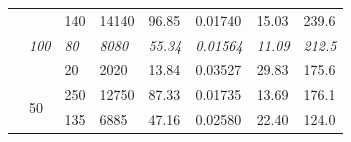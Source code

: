 \documentclass[a4paper, 11pt]{report}
\begin{document}
\begin{table}[ht]
\begin{tabular}{|l|l|l|l|l|l|l|l|}
        \cline{2-8}
                                                                                & \multirow{3}{*}{\textit{100 }}                                                  & 140                                                                    & 14140                                                                      & 96.85                                                                                            & 0.01740          & 15.03          & 239.6                                                                       \\ 
        \cline{3-8}
                                                                                &                                                                                 & \textit{80}                                                            & \textit{8080}                                                              & \textit{55.34}                                                                                   & \textit{0.01564} & \textit{11.09} & \textit{212.5}                                                              \\ 
        \cline{3-8}
                                                                                &                                                                                 & 20                                                                     & 2020                                                                       & 13.84                                                                                            & 0.03527          & 29.83          & 175.6                                                                       \\ 
        \cline{2-8}
                                                                                & \multirow{3}{*}{50}                                                             & 250                                                                    & 12750                                                                      & 87.33                                                                                            & 0.01735          & 13.69          & 176.1                                                                       \\ 
        \cline{3-8}
                                                                                &                                                                                 & 135                                                                    & 6885                                                                       & 47.16                                                                                            & 0.02580          & 22.40          & 124.0                                                                       \\ 

\end{tabular}
\end{table}
\end{document}
